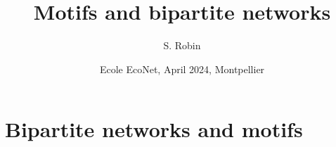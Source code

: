 \documentclass[9pt]{beamer}
\begin{document}
\title{Motifs and bipartite networks}
\author{S. Robin}
\date[EcoNet, Apr'24]{Ecole EcoNet, April 2024, Montpellier}
\maketitle


\section{Bipartite networks and motifs}
\end{document}
